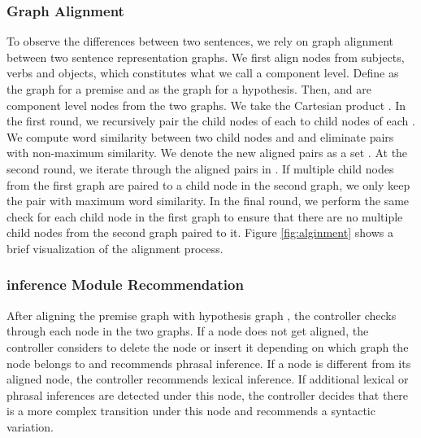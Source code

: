 \documentclass[11pt,a4paper]{article}
\begin{document}
\subsubsection{Graph Alignment}
To observe the differences between two sentences, we rely on graph alignment between two sentence representation graphs. We first align nodes from subjects, verbs and objects, which constitutes what we call a component level. Define  as the graph for a premise and  as the graph for a hypothesis. Then,  and  are component level nodes from the two graphs. We take
the Cartesian product   . In the first round, we recursively pair the child nodes of each  to child nodes of each . 
We compute word similarity between two child nodes  and  and eliminate pairs with non-maximum similarity. We denote the new aligned pairs as a set . At the second round, we iterate through the aligned pairs in . If multiple child nodes from the first graph are paired to a child node in the second graph, we only keep the pair with maximum word similarity. In the final round, we perform the same check for each child node in the first graph to ensure that there are no multiple child nodes from the second graph paired to it. Figure \ref{fig:alginment} shows a brief visualization of the alignment process. 

\subsubsection{inference Module Recommendation}
After aligning the premise graph  with hypothesis graph , the controller checks through each node in the two graphs. If a node does not get aligned, the controller considers to delete the node or insert it depending on which graph the node belongs to and recommends phrasal inference. If a node is different from its aligned node, the controller recommends lexical inference. If additional lexical or phrasal inferences are detected under this node, the controller decides that there is a more complex transition under this node and recommends a syntactic variation.
\end{document}
